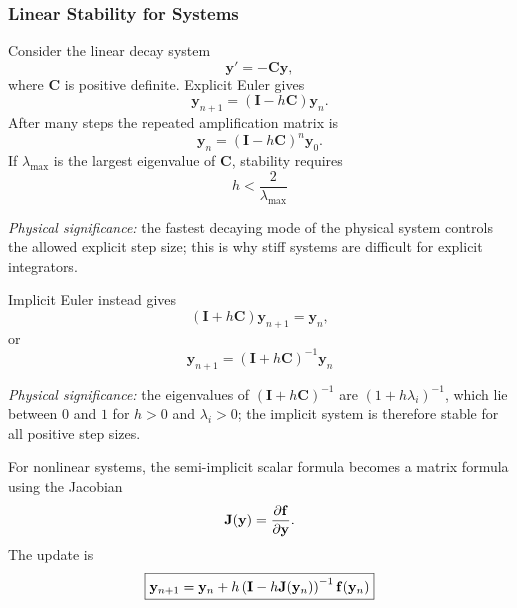 \subsubsection{Linear Stability for Systems}
Consider the linear decay system
\begin{equation}
    \mathbf{y}'=-\mathbf{C}\mathbf{y},
    \label{eq:lec06:linear-system}
\end{equation}
where $\mathbf{C}$ is positive definite. Explicit Euler gives
\begin{equation}
    \mathbf{y}_{n+1}
    =\left(\mathbf{I}-h\mathbf{C}\right)\mathbf{y}_n.
    \label{eq:lec06:explicit-system}
\end{equation}
After many steps the repeated amplification matrix is
\begin{equation}
    \mathbf{y}_{n}
    =\left(\mathbf{I}-h\mathbf{C}\right)^n\mathbf{y}_0.
    \label{eq:lec06:explicit-system-many}
\end{equation}
If $\lambda_{\max}$ is the largest eigenvalue of $\mathbf{C}$, stability
requires
\begin{equation}
    \boxed{
    h<\frac{2}{\lambda_{\max}}}
    \label{eq:lec06:system-stability-condition}
\end{equation}

\textit{Physical significance:} the fastest decaying mode of the physical
system controls the allowed explicit step size; this is why stiff systems are
difficult for explicit integrators.

Implicit Euler instead gives
\begin{equation}
    \left(\mathbf{I}+h\mathbf{C}\right)\mathbf{y}_{n+1}
    =\mathbf{y}_n,
    \label{eq:lec06:implicit-system-solve}
\end{equation}
or
\begin{equation}
    \boxed{
    \mathbf{y}_{n+1}
    =\left(\mathbf{I}+h\mathbf{C}\right)^{-1}\mathbf{y}_n}
    \label{eq:lec06:implicit-system-result}
\end{equation}

\textit{Physical significance:} the eigenvalues of
$(\mathbf{I}+h\mathbf{C})^{-1}$ are $(1+h\lambda_i)^{-1}$, which lie between
$0$ and $1$ for $h>0$ and $\lambda_i>0$; the implicit system is therefore
stable for all positive step sizes.

For nonlinear systems, the semi-implicit scalar formula becomes a matrix
formula using the Jacobian
\begin{equation}
    \mathbf{J}(\mathbf{y})=
    \frac{\partial \mathbf{f}}{\partial \mathbf{y}}.
    \label{eq:lec06:jacobian-definition}
\end{equation}
The update is
\begin{equation}
    \boxed{
    \mathbf{y}_{n+1}
    =\mathbf{y}_n+h
    \left(\mathbf{I}-h\mathbf{J}(\mathbf{y}_n)\right)^{-1}
    \mathbf{f}(\mathbf{y}_n)}
    \label{eq:lec06:semi-implicit-system}
\end{equation}

